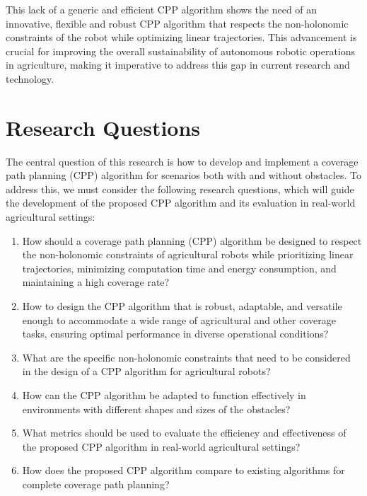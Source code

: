 \vspace*{3mm} 

This lack of a generic and efficient CPP algorithm shows the need of an innovative, flexible and robust CPP algorithm that respects the non-holonomic constraints of the robot while optimizing linear trajectories. This advancement is crucial for improving the overall sustainability of autonomous robotic operations in agriculture, making it imperative to address this gap in current research and technology.

\section{Research Questions}

The central question of this research is how to develop and implement a coverage path planning (CPP) algorithm for scenarios both with and without obstacles. To address this, we must consider the following research questions, which will guide the development of the proposed CPP algorithm and its evaluation in real-world agricultural settings:


\begin{enumerate}
  \item How should a coverage path planning (CPP) algorithm be designed to respect the non-holonomic constraints of agricultural robots while prioritizing linear trajectories, minimizing computation time and energy consumption, and maintaining a high coverage rate?
  
  \item How to design the CPP algorithm that is robust, adaptable, and versatile enough to accommodate a wide range of agricultural and other coverage tasks, ensuring optimal performance in diverse operational conditions?
  
  \item What are the specific non-holonomic constraints that need to be considered in the design of a CPP algorithm for agricultural robots?

  \item How can the CPP algorithm be adapted to function effectively in environments with different shapes and sizes of the obstacles?
  
  \item What metrics should be used to evaluate the efficiency and effectiveness of the proposed CPP algorithm in real-world agricultural settings?
  
  \item How does the proposed CPP algorithm compare to existing algorithms for complete coverage path planning?

\end{enumerate}



